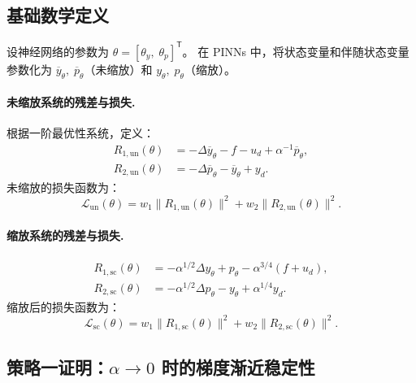 \documentclass[UTF8, 12pt]{ctexart}
\begin{document}
\subsection{基础数学定义}
\label{subsec:math-defs}

设神经网络的参数为 $\theta = [\theta_y,\;\theta_p]^\mathsf{T}$。
在 PINNs 中，将状态变量和伴随状态变量参数化为
$\overline{y}_\theta,\;\overline{p}_\theta$（未缩放）和 $y_\theta,\;p_\theta$（缩放）。

\paragraph{未缩放系统的残差与损失.}
根据一阶最优性系统，定义：
\begin{align}
  R_{1,\mathrm{un}}(\theta) &= -\Delta\overline{y}_\theta - f - u_d + \alpha^{-1}\overline{p}_\theta, \label{eq:R1-un}\\
  R_{2,\mathrm{un}}(\theta) &= -\Delta\overline{p}_\theta - \overline{y}_\theta + y_d. \label{eq:R2-un}
\end{align}
未缩放的损失函数为：
\begin{equation}
  \mathcal{L}_{\mathrm{un}}(\theta)
  = w_1\|R_{1,\mathrm{un}}(\theta)\|^2 + w_2\|R_{2,\mathrm{un}}(\theta)\|^2.
  \label{eq:loss-un}
\end{equation}

\paragraph{缩放系统的残差与损失.}
\begin{align}
  R_{1,\mathrm{sc}}(\theta) &= -\alpha^{1/2}\Delta y_\theta + p_\theta - \alpha^{3/4}(f + u_d), \label{eq:R1-sc}\\
  R_{2,\mathrm{sc}}(\theta) &= -\alpha^{1/2}\Delta p_\theta - y_\theta + \alpha^{1/4}y_d. \label{eq:R2-sc}
\end{align}
缩放后的损失函数为：
\begin{equation}
  \mathcal{L}_{\mathrm{sc}}(\theta)
  = w_1\|R_{1,\mathrm{sc}}(\theta)\|^2 + w_2\|R_{2,\mathrm{sc}}(\theta)\|^2.
  \label{eq:loss-sc}
\end{equation}


\subsection{策略一证明：$\alpha\to 0$ 时的梯度渐近稳定性}
\label{subsec:proof-alpha}
\end{document}
